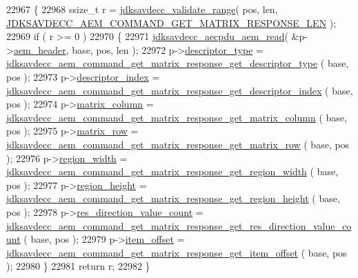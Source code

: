 \begin{DoxyCode}
22967 \{
22968     ssize\_t r = \hyperlink{group__util_ga9c02bdfe76c69163647c3196db7a73a1}{jdksavdecc\_validate\_range}( pos, len, 
      \hyperlink{group__command__get__matrix__response_ga1e5cff1febbf3cdec919f94c81e3161d}{JDKSAVDECC\_AEM\_COMMAND\_GET\_MATRIX\_RESPONSE\_LEN} );
22969     \textcolor{keywordflow}{if} ( r >= 0 )
22970     \{
22971         \hyperlink{group__aecpdu__aem_gae2421015dcdce745b4f03832e12b4fb6}{jdksavdecc\_aecpdu\_aem\_read}( &p->\hyperlink{structjdksavdecc__aem__command__get__matrix__response_ae1e77ccb75ff5021ad923221eab38294}{aem\_header}, base, pos, len );
22972         p->\hyperlink{structjdksavdecc__aem__command__get__matrix__response_ab7c32b6c7131c13d4ea3b7ee2f09b78d}{descriptor\_type} = 
      \hyperlink{group__command__get__matrix__response_ga69958e72b1d4189f9c21965b6f40d17a}{jdksavdecc\_aem\_command\_get\_matrix\_response\_get\_descriptor\_type}
      ( base, pos );
22973         p->\hyperlink{structjdksavdecc__aem__command__get__matrix__response_a042bbc76d835b82d27c1932431ee38d4}{descriptor\_index} = 
      \hyperlink{group__command__get__matrix__response_gaa0ada59a8293e8676299e3f5a74556cf}{jdksavdecc\_aem\_command\_get\_matrix\_response\_get\_descriptor\_index}
      ( base, pos );
22974         p->\hyperlink{structjdksavdecc__aem__command__get__matrix__response_aa7db0d3d8cd5b895d1f9bf81b816fd66}{matrix\_column} = 
      \hyperlink{group__command__get__matrix__response_ga780afedf0a5529396576071d667977c1}{jdksavdecc\_aem\_command\_get\_matrix\_response\_get\_matrix\_column}
      ( base, pos );
22975         p->\hyperlink{structjdksavdecc__aem__command__get__matrix__response_a8cb269dcca919ec8232ec33a09477c07}{matrix\_row} = 
      \hyperlink{group__command__get__matrix__response_ga6fd316bbb922768efe68b9b87efc0386}{jdksavdecc\_aem\_command\_get\_matrix\_response\_get\_matrix\_row}
      ( base, pos );
22976         p->\hyperlink{structjdksavdecc__aem__command__get__matrix__response_a87453b735ebc871f58f507139df28b89}{region\_width} = 
      \hyperlink{group__command__get__matrix__response_ga7050caf28ca30de6a085d4adb1c4b9a6}{jdksavdecc\_aem\_command\_get\_matrix\_response\_get\_region\_width}
      ( base, pos );
22977         p->\hyperlink{structjdksavdecc__aem__command__get__matrix__response_afac2ca21b44ee4f90b555f2609321c60}{region\_height} = 
      \hyperlink{group__command__get__matrix__response_ga27aab00e7181930414b65f88eed31d6d}{jdksavdecc\_aem\_command\_get\_matrix\_response\_get\_region\_height}
      ( base, pos );
22978         p->\hyperlink{structjdksavdecc__aem__command__get__matrix__response_a0f34ba05787e5027402de5f250c3a5a6}{res\_direction\_value\_count} = 
      \hyperlink{group__command__get__matrix__response_gae9929f796cbb4ca114ff2662cdc62164}{jdksavdecc\_aem\_command\_get\_matrix\_response\_get\_res\_direction\_value\_count}
      ( base, pos );
22979         p->\hyperlink{structjdksavdecc__aem__command__get__matrix__response_afbb15486d86fc9c3680a6864ddbc029b}{item\_offset} = 
      \hyperlink{group__command__get__matrix__response_gabd0400fc6df0ec7b7e1b417a86678c46}{jdksavdecc\_aem\_command\_get\_matrix\_response\_get\_item\_offset}
      ( base, pos );
22980     \}
22981     \textcolor{keywordflow}{return} r;
22982 \}
\end{DoxyCode}


